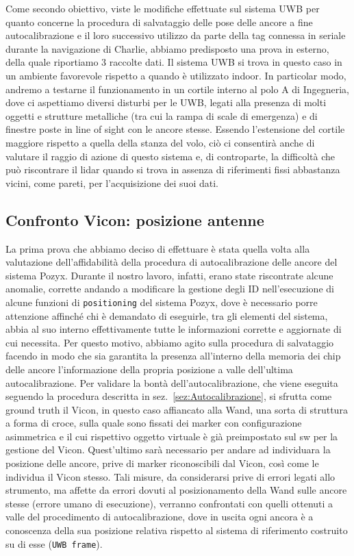 Come secondo obiettivo, viste le modifiche effettuate sul sistema UWB per quanto concerne la procedura di salvataggio delle pose delle ancore a fine autocalibrazione e il loro successivo utilizzo da parte della tag connessa in seriale durante la navigazione di Charlie, abbiamo predisposto una prova in esterno, della quale riportiamo 3 raccolte dati. Il sistema UWB si trova in questo caso in un ambiente favorevole rispetto a quando è utilizzato indoor. In particolar modo, andremo a testarne il funzionamento in un cortile interno al polo A di Ingegneria, dove ci aspettiamo diversi disturbi per le UWB, legati alla presenza di molti oggetti e strutture metalliche (tra cui la rampa di scale di emergenza) e di finestre poste in line of sight con le ancore stesse.
Essendo l'estensione del cortile maggiore rispetto a quella della stanza del volo, ciò ci consentirà anche di valutare il raggio di azione di questo sistema e, di controparte, la difficoltà che può riscontrare il lidar quando si trova in assenza di riferimenti fissi abbastanza vicini, come pareti, per l'acquisizione dei suoi dati.

\subsection{Confronto Vicon: posizione antenne}

La prima prova che abbiamo deciso di effettuare è stata quella volta alla valutazione dell'affidabilità della procedura di autocalibrazione delle ancore del sistema Pozyx. Durante il nostro lavoro, infatti, erano state riscontrate alcune anomalie, corrette andando a modificare la gestione degli ID nell'esecuzione di alcune funzioni di \verb|positioning| del sistema Pozyx, dove è necessario porre attenzione affinché chi è demandato di eseguirle, tra gli elementi del sistema, abbia al suo interno effettivamente tutte le informazioni corrette e aggiornate di cui necessita. Per questo motivo, abbiamo agito sulla procedura di salvataggio facendo in modo che sia garantita la presenza all'interno della memoria dei chip delle ancore l'informazione della propria posizione a valle dell'ultima autocalibrazione. 
Per validare la bontà dell'autocalibrazione, che viene eseguita seguendo la procedura descritta in sez.~\ref{sez:Autocalibrazione}, si sfrutta come ground truth il Vicon, in questo caso affiancato alla Wand, una sorta di struttura a forma di croce, sulla quale sono fissati dei marker con configurazione asimmetrica e il cui rispettivo oggetto virtuale è già preimpostato sul sw per la gestione del Vicon. 
Quest'ultimo sarà necessario per andare ad individuara la posizione delle ancore, prive di marker riconoscibili dal Vicon, così come le individua il Vicon stesso. Tali misure, da considerarsi prive di errori legati allo strumento, ma affette da errori dovuti al posizionamento della Wand sulle ancore stesse (errore umano di esecuzione), verranno confrontati con quelli ottenuti a valle del procedimento di autocalibrazione, dove in uscita ogni ancora è a conoscenza della sua posizione relativa rispetto al sistema di riferimento costruito su di esse (\verb|UWB frame|).

